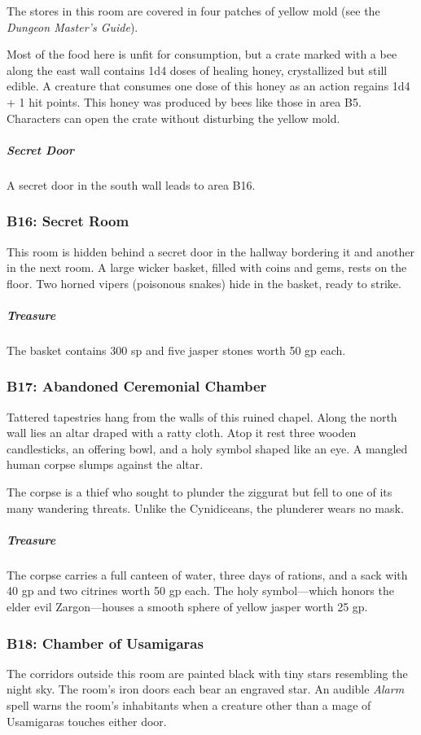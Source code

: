 \documentclass[10pt,a4paper,twoside,bg=print,twocolumn,openany,nodeprecatedcode]{dndbook}
\begin{document}
The stores in this room are covered in four patches of yellow mold (see the \textit{Dungeon Master's Guide}).

Most of the food here is unfit for consumption, but a crate marked with a bee along the east wall contains 1d4 doses of healing honey, crystallized but still edible. A creature that consumes one dose of this honey as an action regains 1d4 + 1 hit points. This honey was produced by bees like those in area B5. Characters can open the crate without disturbing the yellow mold.

\subparagraph{Secret Door}
A secret door in the south wall leads to area B16.

\subsubsection{B16: Secret Room}
This room is hidden behind a secret door in the hallway bordering it and another in the next room. A large wicker basket, filled with coins and gems, rests on the floor. Two horned vipers (poisonous snakes) hide in the basket, ready to strike.

\subparagraph{Treasure}
The basket contains 300 sp and five jasper stones worth 50 gp each.

\subsubsection{B17: Abandoned Ceremonial Chamber}
\begin{DndReadAloud}{}
Tattered tapestries hang from the walls of this ruined chapel. Along the north wall lies an altar draped with a ratty cloth. Atop it rest three wooden candlesticks, an offering bowl, and a holy symbol shaped like an eye. A mangled human corpse slumps against the altar.

\end{DndReadAloud}

The corpse is a thief who sought to plunder the ziggurat but fell to one of its many wandering threats. Unlike the Cynidiceans, the plunderer wears no mask.

\subparagraph{Treasure}
The corpse carries a full canteen of water, three days of rations, and a sack with 40 gp and two citrines worth 50 gp each. The holy symbol—which honors the elder evil Zargon—houses a smooth sphere of yellow jasper worth 25 gp.

\subsubsection{B18: Chamber of Usamigaras}
The corridors outside this room are painted black with tiny stars resembling the night sky. The room's iron doors each bear an engraved star. An audible \textit{Alarm} spell warns the room's inhabitants when a creature other than a mage of Usamigaras touches either door.
\end{document}
